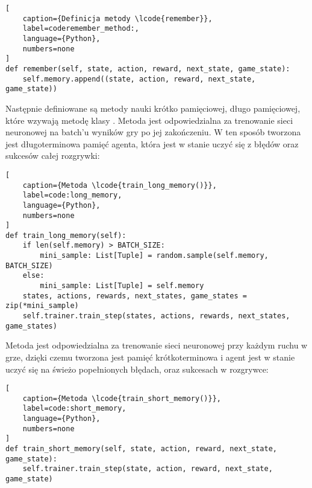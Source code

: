 \begin{onepage}
    \begin{lstlisting}[
    caption={Definicja metody \lcode{remember}},
    label=coderemember_method:,
    language={Python},
    numbers=none
]
def remember(self, state, action, reward, next_state, game_state):
    self.memory.append((state, action, reward, next_state, game_state))
    \end{lstlisting}
\end{onepage}



Następnie definiowane są metody nauki krótko pamięciowej, długo pamięciowej, które wzywają metodę  klasy .
\clearpage
Metoda  jest odpowiedzialna za trenowanie sieci neuronowej na batch'u wyników gry po jej zakończeniu. W ten sposób tworzona jest długoterminowa pamięć agenta, która jest w stanie uczyć się z błędów oraz sukcesów całej rozgrywki:

\begin{onepage}
    \begin{lstlisting}[
    caption={Metoda \lcode{train_long_memory()}},
    label=code:long_memory,
    language={Python},
    numbers=none
]
def train_long_memory(self):
    if len(self.memory) > BATCH_SIZE:
        mini_sample: List[Tuple] = random.sample(self.memory, BATCH_SIZE)
    else:
        mini_sample: List[Tuple] = self.memory
    states, actions, rewards, next_states, game_states = zip(*mini_sample)
    self.trainer.train_step(states, actions, rewards, next_states, game_states)

\end{lstlisting}
\end{onepage}



Metoda  jest odpowiedzialna za trenowanie sieci neuronowej przy każdym ruchu w grze, dzięki czemu tworzona jest pamięć krótkoterminowa i agent jest w stanie uczyć się na świeżo popełnionych błędach, oraz sukcesach w rozgrywce:

\begin{onepage}
    \begin{lstlisting}[
    caption={Metoda \lcode{train_short_memory()}},
    label=code:short_memory,
    language={Python},
    numbers=none
]
def train_short_memory(self, state, action, reward, next_state, game_state):
    self.trainer.train_step(state, action, reward, next_state, game_state)

    \end{lstlisting}
\end{onepage}

